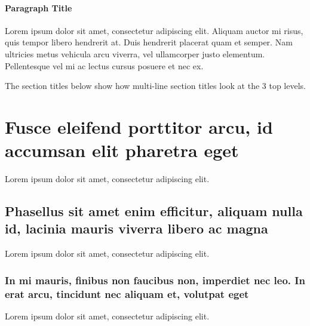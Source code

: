 \documentclass[
	a4paper, %
	11pt, %
]{DC_Report}
\begin{document}
\paragraph{Paragraph Title} %

Lorem ipsum dolor sit amet, consectetur adipiscing elit. Aliquam auctor mi risus, quis tempor libero hendrerit at. Duis hendrerit placerat quam et semper. Nam ultricies metus vehicula arcu viverra, vel ullamcorper justo elementum. Pellentesque vel mi ac lectus cursus posuere et nec ex.

The section titles below show how multi-line section titles look at the 3 top levels.

\section[Short version of long section title]{Fusce eleifend porttitor arcu, id accumsan elit pharetra eget} %

Lorem ipsum dolor sit amet, consectetur adipiscing elit. 

\subsection[Short version of long subsection title]{Phasellus sit amet enim efficitur, aliquam nulla id, lacinia mauris viverra libero ac magna}

Lorem ipsum dolor sit amet, consectetur adipiscing elit.

\subsubsection{In mi mauris, finibus non faucibus non, imperdiet nec leo. In erat arcu, tincidunt nec aliquam et, volutpat eget}

Lorem ipsum dolor sit amet, consectetur adipiscing elit.

\end{document}
